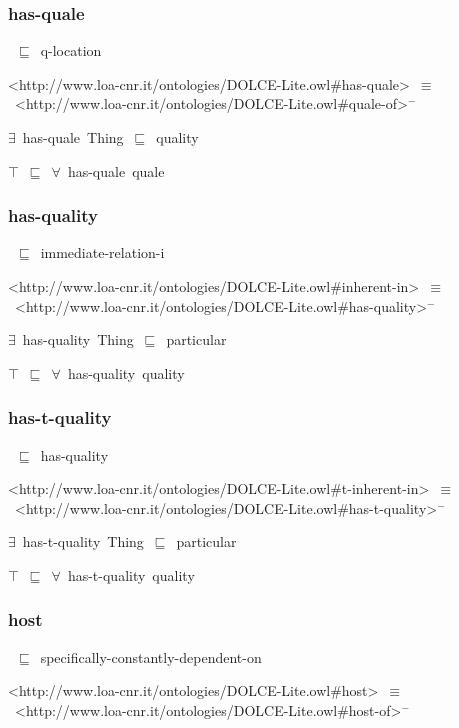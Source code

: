 \documentclass{article}
\begin{document}
\subsubsection*{has-quale}

~\ensuremath{\sqsubseteq}~q-location

<http://www.loa-cnr.it/ontologies/DOLCE-Lite.owl#has-quale>~\ensuremath{\equiv}~<http://www.loa-cnr.it/ontologies/DOLCE-Lite.owl#quale-of>\ensuremath{^-}

\ensuremath{\exists}~has-quale~Thing~\ensuremath{\sqsubseteq}~quality

\ensuremath{\top}~\ensuremath{\sqsubseteq}~\ensuremath{\forall}~has-quale~quale

\subsubsection*{has-quality}

~\ensuremath{\sqsubseteq}~immediate-relation-i

<http://www.loa-cnr.it/ontologies/DOLCE-Lite.owl#inherent-in>~\ensuremath{\equiv}~<http://www.loa-cnr.it/ontologies/DOLCE-Lite.owl#has-quality>\ensuremath{^-}

\ensuremath{\exists}~has-quality~Thing~\ensuremath{\sqsubseteq}~particular

\ensuremath{\top}~\ensuremath{\sqsubseteq}~\ensuremath{\forall}~has-quality~quality

\subsubsection*{has-t-quality}

~\ensuremath{\sqsubseteq}~has-quality

<http://www.loa-cnr.it/ontologies/DOLCE-Lite.owl#t-inherent-in>~\ensuremath{\equiv}~<http://www.loa-cnr.it/ontologies/DOLCE-Lite.owl#has-t-quality>\ensuremath{^-}

\ensuremath{\exists}~has-t-quality~Thing~\ensuremath{\sqsubseteq}~particular

\ensuremath{\top}~\ensuremath{\sqsubseteq}~\ensuremath{\forall}~has-t-quality~quality

\subsubsection*{host}

~\ensuremath{\sqsubseteq}~specifically-constantly-dependent-on

<http://www.loa-cnr.it/ontologies/DOLCE-Lite.owl#host>~\ensuremath{\equiv}~<http://www.loa-cnr.it/ontologies/DOLCE-Lite.owl#host-of>\ensuremath{^-}
\end{document}
